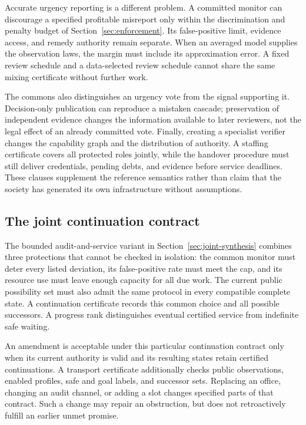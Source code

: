 \documentclass[11pt,letterpaper]{article}
\theoremstyle{plain}
\theoremstyle{definition}
\theoremstyle{remark}
\begin{document}
Accurate urgency reporting is a different problem. A committed monitor can discourage a specified profitable misreport only within the discrimination and penalty budget of Section~\ref{sec:enforcement}. Its false-positive limit, evidence access, and remedy authority remain separate. When an averaged model supplies the observation laws, the margin must include its approximation error. A fixed review schedule and a data-selected review schedule cannot share the same mixing certificate without further work.

The commons also distinguishes an urgency vote from the signal supporting it. Decision-only publication can reproduce a mistaken cascade; preservation of independent evidence changes the information available to later reviewers, not the legal effect of an already committed vote. Finally, creating a specialist verifier changes the capability graph and the distribution of authority. A staffing certificate covers all protected roles jointly, while the handover procedure must still deliver credentials, pending debts, and evidence before service deadlines. These clauses supplement the reference semantics rather than claim that the society has generated its own infrastructure without assumptions.

\subsection{The joint continuation contract}
The bounded audit-and-service variant in Section~\ref{sec:joint-synthesis} combines three protections that cannot be checked in isolation: the common monitor must deter every listed deviation, its false-positive rate must meet the cap, and its resource use must leave enough capacity for all due work. The current public possibility set must also admit the same protocol in every compatible complete state. A continuation certificate records this common choice and all possible successors. A progress rank distinguishes eventual certified service from indefinite safe waiting.

An amendment is acceptable under this particular continuation contract only when its current authority is valid and its resulting states retain certified continuations. A transport certificate additionally checks public observations, enabled profiles, safe and goal labels, and successor sets. Replacing an office, changing an audit channel, or adding a slot changes specified parts of that contract. Such a change may repair an obstruction, but does not retroactively fulfill an earlier unmet promise.
\FloatBarrier
\end{document}
